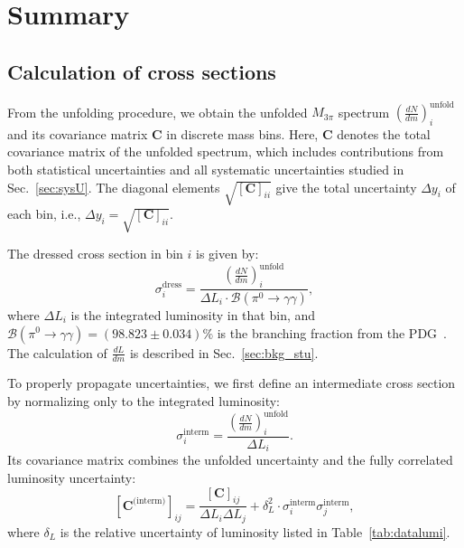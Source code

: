 \clearpage
\section{Summary}
\label{sec:summary}

\subsection{Calculation of cross sections}

From the unfolding procedure, we obtain the unfolded $M_{3\pi}$ spectrum $\left( \frac{dN}{dm} \right)^{\text{unfold}}_i$ and its covariance matrix $\mathbf{C}$ in discrete mass bins. Here, $\mathbf{C}$ denotes the total covariance matrix of the unfolded spectrum, which includes contributions from both statistical uncertainties and all systematic uncertainties studied in Sec.~\ref{sec:sysU}. The diagonal elements $\sqrt{[\mathbf{C}]_{ii}}$ give the total uncertainty $\Delta y_i$ of each bin, i.e., $\Delta y_i = \sqrt{[\mathbf{C}]_{ii}}$.

The dressed cross section in bin $i$ is given by:
\begin{equation}
    \sigma_i^{\text{dress}} = \frac{\left( \frac{dN}{dm} \right)^{\text{unfold}}_i}{\Delta L_i \cdot \mathcal{B}(\pi^{0} \to \gamma\gamma)},
    \label{eq:dressed_cross_section}
\end{equation}
where $\Delta L_i$ is the integrated luminosity in that bin, and $\mathcal{B}(\pi^{0} \to \gamma\gamma) = (98.823 \pm 0.034)\%$ is the branching fraction from the PDG~\cite{PDG2024}. The calculation of $\frac{dL}{dm}$ is described in Sec.~\ref{sec:bkg_stu}.

To properly propagate uncertainties, we first define an intermediate cross section by normalizing only to the integrated luminosity:
\begin{equation}
    \sigma_i^{\text{interm}} = \frac{\left( \frac{dN}{dm} \right)^{\text{unfold}}_i}{\Delta L_i}.
    \label{eq:interm_cross_section}
\end{equation}
Its covariance matrix combines the unfolded uncertainty and the fully correlated luminosity uncertainty:
\begin{equation}
    \left[\mathbf{C}^{\text{(interm)}}\right]_{ij} = \frac{[\mathbf{C}]_{ij}}{\Delta L_i \Delta L_j} + \delta_L^2 \cdot \sigma_i^{\text{interm}} \sigma_j^{\text{interm}},
    \label{eq:interm_covariance}
\end{equation}
where $\delta_L$ is the relative uncertainty of luminosity listed in Table~\ref{tab:datalumi}.

